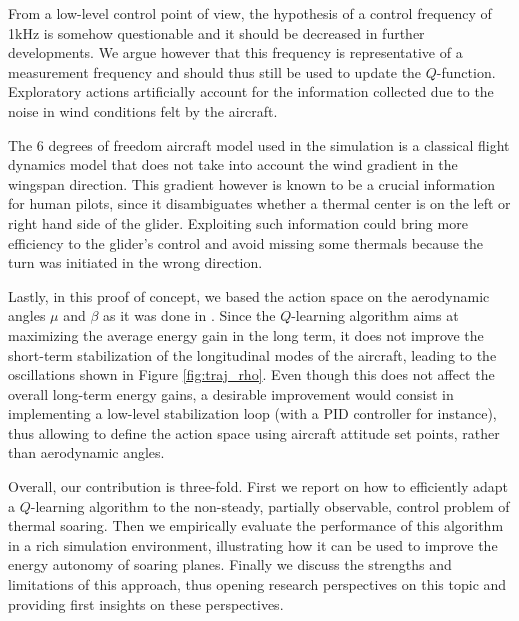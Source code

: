 \documentclass[a4paper, 10pt, conference]{ieeeconf}
\begin{document}
From a low-level control point of view, the hypothesis of a control frequency of 1kHz is somehow questionable and it should be decreased in further developments. We argue however that this frequency is representative of a measurement frequency and should thus still be used to update the $Q$-function. Exploratory actions artificially account for the information collected due to the noise in wind conditions felt by the aircraft.

The 6 degrees of freedom aircraft model used in the simulation is a classical flight dynamics model that does not take into account the wind gradient in the wingspan direction. This gradient however is known to be a crucial information for human pilots, since it disambiguates whether a thermal center is on the left or right hand side of the glider. Exploiting such information could bring more efficiency to the glider's control and avoid missing some thermals because the turn was initiated in the wrong direction.

Lastly, in this proof of concept, we based the action space on the aerodynamic angles $\mu$ and $\beta$ as it was done in \cite{dynamic}. Since the $Q$-learning algorithm aims at maximizing the average energy gain in the long term, it does not improve the short-term stabilization of the longitudinal modes of the aircraft, leading to the oscillations shown in Figure \ref{fig:traj_rho}. Even though this does not affect the overall long-term energy gains, a desirable improvement would consist in implementing a low-level stabilization loop (with a PID controller for instance), thus allowing to define the action space using aircraft attitude set points, rather than aerodynamic angles.

Overall, our contribution is three-fold. First we report on how to efficiently adapt a $Q$-learning algorithm to the non-steady, partially observable, control problem of thermal soaring. Then we empirically evaluate the performance of this algorithm in a rich simulation environment, illustrating how it can be used to improve the energy autonomy of soaring planes. Finally we discuss the strengths and limitations of this approach, thus opening research perspectives on this topic and providing first insights on these perspectives.
\end{document}
